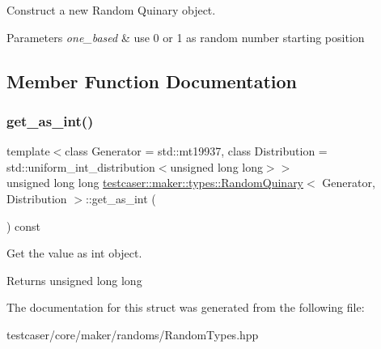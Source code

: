 Construct a new Random Quinary object. 


\begin{DoxyParams}{Parameters}
{\em one\+\_\+based} & use 0 or 1 as random number starting position \\
\hline
\end{DoxyParams}


\subsection{Member Function Documentation}
\mbox{\label{structtestcaser_1_1maker_1_1types_1_1RandomQuinary_a401eeaaf276f7a769f2e1397820ee430}} 
\subsubsection{\texorpdfstring{get\+\_\+as\+\_\+int()}{get\_as\_int()}}
{\footnotesize\ttfamily template$<$class Generator = std\+::mt19937, class Distribution = std\+::uniform\+\_\+int\+\_\+distribution$<$unsigned long long$>$$>$ \\
unsigned long long \hyperlink{structtestcaser_1_1maker_1_1types_1_1RandomQuinary}{testcaser\+::maker\+::types\+::\+Random\+Quinary}$<$ Generator, Distribution $>$\+::get\+\_\+as\+\_\+int (\begin{DoxyParamCaption}{ }\end{DoxyParamCaption}) const\hspace{0.3cm}{\ttfamily [inline]}}



Get the value as int object. 

\begin{DoxyReturn}{Returns}
unsigned long long 
\end{DoxyReturn}


The documentation for this struct was generated from the following file\+:\begin{DoxyCompactItemize}
\item 
testcaser/core/maker/randoms/Random\+Types.\+hpp\end{DoxyCompactItemize}
